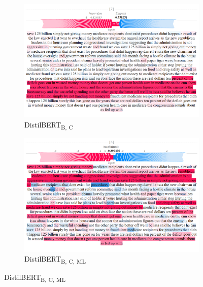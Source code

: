 \begin{figure}[!h]
    \begin{subfigure}[t]{0.4\textwidth}
        \includegraphics[width=\textwidth]{figs/all_F/distil-b-c.png}
        \caption{{DistilBERT}\textsubscript{B, C}}
    \end{subfigure}
    \hspace{\fill} %
    \begin{subfigure}[t]{0.4\textwidth}
        \includegraphics[width=\linewidth]{figs/all_F/bert-b-ml-c.png}
        \caption{{DistilBERT}\textsubscript{B, C, ML}}
    \end{subfigure}


\end{figure}
